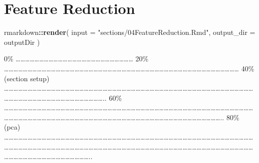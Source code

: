 \documentclass[
]{article}
\newenvironment{Shaded}{\begin{snugshade}}{\end{snugshade}}
\newcommand{\AttributeTok}[1]{\textcolor[rgb]{0.13,0.29,0.53}{#1}}
\newcommand{\FunctionTok}[1]{\textcolor[rgb]{0.13,0.29,0.53}{\textbf{#1}}}
\newcommand{\NormalTok}[1]{#1}
\newcommand{\SpecialCharTok}[1]{\textcolor[rgb]{0.81,0.36,0.00}{\textbf{#1}}}
\newcommand{\StringTok}[1]{\textcolor[rgb]{0.31,0.60,0.02}{#1}}
\begin{document}
\hypertarget{feature-reduction}{%
\section{Feature Reduction}\label{feature-reduction}}

\begin{Shaded}
\begin{Highlighting}[]
\NormalTok{rmarkdown}\SpecialCharTok{::}\FunctionTok{render}\NormalTok{(}
  \AttributeTok{input =} \StringTok{"sections/04FeatureReduction.Rmd"}\NormalTok{,}
  \AttributeTok{output\_dir =}\NormalTok{ outputDir}
\NormalTok{)}
\end{Highlighting}
\end{Shaded}

\textbar{} \textbar{} \textbar{} 0\% \textbar{}
\textbar\ldots\ldots\ldots\ldots\ldots\ldots\ldots\ldots\ldots\ldots\ldots\ldots\ldots\ldots\ldots\ldots\ldots\ldots\ldots\ldots\ldots\ldots\ldots\ldots\ldots{}
\textbar{} 20\% \textbar{}
\textbar\ldots\ldots\ldots\ldots\ldots\ldots\ldots\ldots\ldots\ldots\ldots\ldots\ldots\ldots\ldots\ldots\ldots\ldots\ldots\ldots\ldots\ldots\ldots\ldots\ldots\ldots\ldots\ldots\ldots\ldots\ldots\ldots\ldots\ldots\ldots\ldots\ldots\ldots\ldots\ldots\ldots\ldots\ldots\ldots\ldots\ldots\ldots\ldots\ldots\ldots{}
\textbar{} 40\% (section setup) \textbar{}
\textbar\ldots\ldots\ldots\ldots\ldots\ldots\ldots\ldots\ldots\ldots\ldots\ldots\ldots\ldots\ldots\ldots\ldots\ldots\ldots\ldots\ldots\ldots\ldots\ldots\ldots\ldots\ldots\ldots\ldots\ldots\ldots\ldots\ldots\ldots\ldots\ldots\ldots\ldots\ldots\ldots\ldots\ldots\ldots\ldots\ldots\ldots\ldots\ldots\ldots\ldots\ldots\ldots\ldots\ldots\ldots\ldots\ldots\ldots\ldots\ldots\ldots\ldots\ldots\ldots\ldots\ldots\ldots\ldots\ldots\ldots\ldots\ldots\ldots\ldots..
\textbar{} 60\% \textbar{}
\textbar\ldots\ldots\ldots\ldots\ldots\ldots\ldots\ldots\ldots\ldots\ldots\ldots\ldots\ldots\ldots\ldots\ldots\ldots\ldots\ldots\ldots\ldots\ldots\ldots\ldots\ldots\ldots\ldots\ldots\ldots\ldots\ldots\ldots\ldots\ldots\ldots\ldots\ldots\ldots\ldots\ldots\ldots\ldots\ldots\ldots\ldots\ldots\ldots\ldots\ldots\ldots\ldots\ldots\ldots\ldots\ldots\ldots\ldots\ldots\ldots\ldots\ldots\ldots\ldots\ldots\ldots\ldots\ldots\ldots\ldots\ldots\ldots\ldots\ldots\ldots\ldots\ldots\ldots\ldots\ldots\ldots\ldots\ldots\ldots\ldots\ldots\ldots\ldots\ldots\ldots\ldots\ldots\ldots\ldots\ldots\ldots\ldots\ldots\ldots..
\textbar{} 80\% (pca) \textbar{}
\textbar\ldots\ldots\ldots\ldots\ldots\ldots\ldots\ldots\ldots\ldots\ldots\ldots\ldots\ldots\ldots\ldots\ldots\ldots\ldots\ldots\ldots\ldots\ldots\ldots\ldots\ldots\ldots\ldots\ldots\ldots\ldots\ldots\ldots\ldots\ldots\ldots\ldots\ldots\ldots\ldots\ldots\ldots\ldots\ldots\ldots\ldots\ldots\ldots\ldots\ldots\ldots\ldots\ldots\ldots\ldots\ldots\ldots\ldots\ldots\ldots\ldots\ldots\ldots\ldots\ldots\ldots\ldots\ldots\ldots\ldots\ldots\ldots\ldots\ldots\ldots\ldots\ldots\ldots\ldots\ldots\ldots\ldots\ldots\ldots\ldots\ldots\ldots\ldots\ldots\ldots\ldots\ldots\ldots\ldots\ldots\ldots\ldots\ldots\ldots\ldots\ldots\ldots\ldots\ldots\ldots\ldots\ldots\ldots\ldots\ldots\ldots\ldots\ldots\ldots\ldots\ldots\ldots\ldots\ldots\ldots\ldots\ldots\ldots\ldots..\textbar{}
\end{document}
